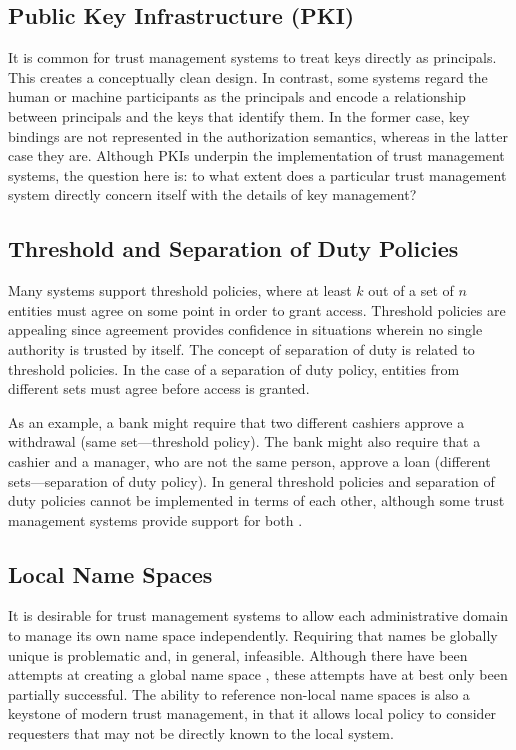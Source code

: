 \subsection{Public Key Infrastructure (PKI)}

It is common for trust management systems to treat keys directly as principals. This creates a
conceptually clean design. In contrast, some systems regard the human or machine participants as
the principals and encode a relationship between principals and the keys that identify them. In
the former case, key bindings are not represented in the authorization semantics, whereas in the
latter case they are. Although PKIs underpin the implementation of trust management systems, the
question here is: to what extent does a particular trust management system directly concern
itself with the details of key management?

\subsection{Threshold and Separation of Duty Policies}

Many systems support threshold policies, where at least $k$ out of a set of $n$ entities must
agree on some point in order to grant access. Threshold policies are appealing since agreement
provides confidence in situations wherein no single authority is trusted by itself. The concept
of separation of duty is related to threshold policies. In the case of a separation of duty
policy, entities from different sets must agree before access is granted.

As an example, a bank might require that two different cashiers approve a withdrawal (same
set---threshold policy). The bank might also require that a cashier and a manager, who are not
the same person, approve a loan (different sets---separation of duty policy). In general
threshold policies and separation of duty policies cannot be implemented in terms of each other,
although some trust management systems provide support for both \cite{Li:DRBTMF}.

\subsection{Local Name Spaces}

It is desirable for trust management systems to allow each administrative domain to manage its
own name space independently. Requiring that names be globally unique is problematic and, in
general, infeasible. Although there have been attempts at creating a global name space
\cite{X500}, these attempts have at best only been partially successful. The ability to
reference non-local name spaces is also a keystone of modern trust management, in that it allows
local policy to consider requesters that may not be directly known to the local system.

